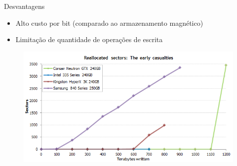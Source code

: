 \documentclass[aspectratio=169,
				xcolor=table]{beamer}
\begin{document}
	\begin{frame}{Desvantagens}
		\begin{itemize}
			\item Alto custo por bit (comparado ao armazenamento magnético)
			\vspace{1em}
			\item Limitação de quantidade de operações de escrita
		\end{itemize}
		
		\begin{figure}[hbtp]
		\centering
		\includegraphics[height=0.6\textheight, keepaspectratio]{../figs/cap08/earlyfailures.png}
		\end{figure}		
	\end{frame}
	
\end{document}

